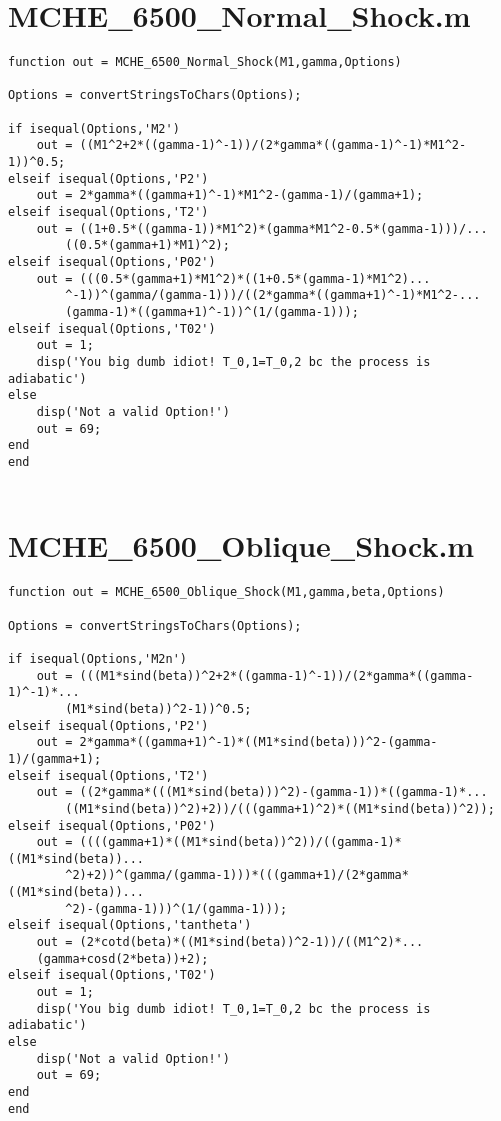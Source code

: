 \documentclass{article}
\begin{document}
\section*{MCHE\_6500\_Normal\_Shock.m}
\begin{lstlisting}[style=Matlab-editor]
function out = MCHE_6500_Normal_Shock(M1,gamma,Options)

Options = convertStringsToChars(Options);

if isequal(Options,'M2')
    out = ((M1^2+2*((gamma-1)^-1))/(2*gamma*((gamma-1)^-1)*M1^2-1))^0.5;
elseif isequal(Options,'P2')
    out = 2*gamma*((gamma+1)^-1)*M1^2-(gamma-1)/(gamma+1);
elseif isequal(Options,'T2')
    out = ((1+0.5*((gamma-1))*M1^2)*(gamma*M1^2-0.5*(gamma-1)))/...
        ((0.5*(gamma+1)*M1)^2);
elseif isequal(Options,'P02')
    out = (((0.5*(gamma+1)*M1^2)*((1+0.5*(gamma-1)*M1^2)...
        ^-1))^(gamma/(gamma-1)))/((2*gamma*((gamma+1)^-1)*M1^2-...
        (gamma-1)*((gamma+1)^-1))^(1/(gamma-1)));
elseif isequal(Options,'T02')
    out = 1;
    disp('You big dumb idiot! T_0,1=T_0,2 bc the process is adiabatic')
else
    disp('Not a valid Option!')
    out = 69;
end
end


\end{lstlisting}

\newpage

\section*{MCHE\_6500\_Oblique\_Shock.m}
\begin{lstlisting}[style=Matlab-editor]
function out = MCHE_6500_Oblique_Shock(M1,gamma,beta,Options)

Options = convertStringsToChars(Options);

if isequal(Options,'M2n')
    out = (((M1*sind(beta))^2+2*((gamma-1)^-1))/(2*gamma*((gamma-1)^-1)*...
        (M1*sind(beta))^2-1))^0.5;
elseif isequal(Options,'P2')
    out = 2*gamma*((gamma+1)^-1)*((M1*sind(beta)))^2-(gamma-1)/(gamma+1);
elseif isequal(Options,'T2')
    out = ((2*gamma*(((M1*sind(beta)))^2)-(gamma-1))*((gamma-1)*...
        ((M1*sind(beta))^2)+2))/(((gamma+1)^2)*((M1*sind(beta))^2));
elseif isequal(Options,'P02')
    out = ((((gamma+1)*((M1*sind(beta))^2))/((gamma-1)*((M1*sind(beta))...
        ^2)+2))^(gamma/(gamma-1)))*(((gamma+1)/(2*gamma*((M1*sind(beta))...
        ^2)-(gamma-1)))^(1/(gamma-1)));
elseif isequal(Options,'tantheta')
    out = (2*cotd(beta)*((M1*sind(beta))^2-1))/((M1^2)*...
    (gamma+cosd(2*beta))+2);
elseif isequal(Options,'T02')
    out = 1;
    disp('You big dumb idiot! T_0,1=T_0,2 bc the process is adiabatic')
else
    disp('Not a valid Option!')
    out = 69;
end
end


\end{lstlisting}
\end{document}
